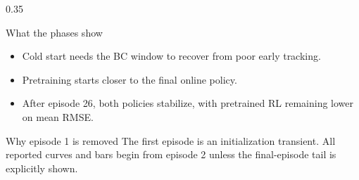 \documentclass[aspectratio=169]{beamer}
\begin{document}
\begin{frame}
\begin{columns}[T,onlytextwidth]
\begin{column}{0.35\textwidth}
\begin{block}{What the phases show}
\begin{itemize}\raggedright
  \setlength\itemsep{0.45ex}
  \item Cold start needs the BC window to recover from poor early tracking.
  \item Pretraining starts closer to the final online policy.
  \item After episode 26, both policies stabilize, with pretrained RL remaining lower on mean RMSE.
\end{itemize}
\end{block}

\vspace{0.05cm}
\begin{block}{Why episode 1 is removed}
\justifying
The first episode is an initialization transient. All reported curves and bars begin from episode 2 unless the final-episode tail is explicitly shown.
\end{block}
\end{column}
\end{columns}

\end{frame}
\end{document}

